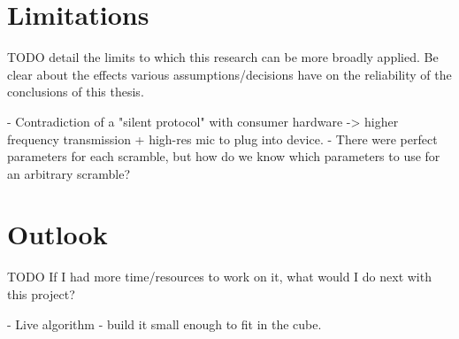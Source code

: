\section{Limitations}

TODO detail the limits to which this research can be more broadly
applied. Be clear about the effects various assumptions/decisions have
on the reliability of the conclusions of this thesis.

- Contradiction of a "silent protocol" with consumer hardware -> higher frequency transmission + high-res mic to plug into device.
- There were perfect parameters for each scramble, but how do we know which parameters to use for an arbitrary scramble?


\section{Outlook}

TODO If I had more time/resources to work on it, what would I do next
with this project?

- Live algorithm
- build it small enough to fit in the cube.